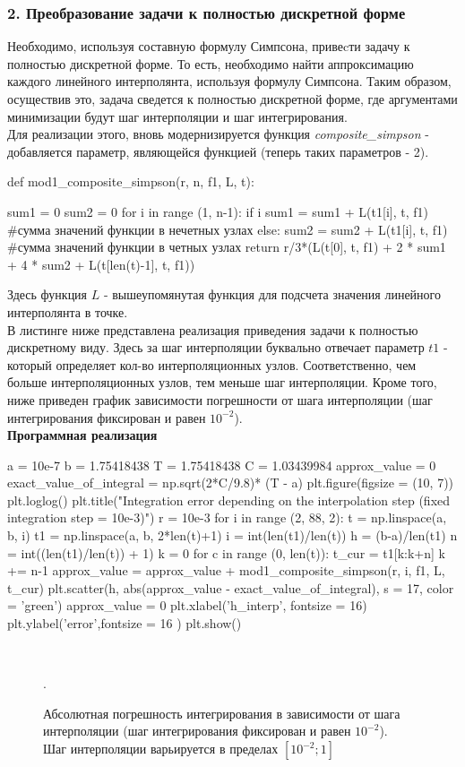 \subsubsection{2. Преобразование задачи к полностью дискретной форме}
Необходимо, используя составную формулу Симпсона, привеcти задачу к полностью дискретной форме. То есть, необходимо найти аппроксимацию каждого линейного интерполянта, используя формулу Симпсона. Таким образом, осуществив это, задача сведется к полностью дискретной форме, где аргументами минимизации будут шаг интерполяции и шаг интегрирования. \\
Для реализации этого, вновь модернизируется функция \textit{composite_simpson} - добавляется параметр, являющейся функцией (теперь таких параметров - 2). 
\begin{python}
def mod1_composite_simpson(r, n, f1, L, t):

  sum1 = 0
  sum2 = 0
  for i in range (1, n-1):
    if i %
      sum1 = sum1 + L(t1[i], t, f1)  #сумма значений функции в нечетных узлах 
    else:
      sum2 = sum2 + L(t1[i], t, f1) #сумма значений функции в четных узлах 
  return r/3*(L(t[0], t, f1) + 2 * sum1 + 4 * sum2 + L(t[len(t)-1], t, f1))
\end{python} 
Здесь функция $L$ - вышеупомянутая функция для подсчета значения линейного интерполянта в точке. \\
В листинге ниже представлена реализация приведения задачи к полностью дискретному виду.
Здесь за шаг интерполяции буквально отвечает параметр $t1$ - который определяет кол-во интерполяционных узлов. Соответственно, чем больше интерполяционных узлов, тем меньше шаг интерполяции. Кроме того, ниже приведен график зависимости погрешности от шага интерполяции (шаг интегрирования фиксирован и равен $10^{-2}$). \\
\textbf{Программная реализация}
\begin{python}
a = 10e-7
b = 1.75418438
T = 1.75418438
C = 1.03439984
approx_value = 0
exact_value_of_integral = np.sqrt(2*C/9.8)* (T - a)
plt.figure(figsize = (10, 7))
plt.loglog()
plt.title("Integration error depending on the interpolation step (fixed integration step = 10e-3)")
r = 10e-3
for i in range (2, 88, 2):
  t = np.linspace(a, b, i)
  t1 = np.linspace(a, b, 2*len(t)+1)
  i = int(len(t1)/len(t))
  h = (b-a)/len(t1)
  n = int((len(t1)/len(t)) + 1)
  k = 0
  for c in range (0, len(t)):
    t_cur = t1[k:k+n]
    k += n-1
    approx_value = approx_value + mod1_composite_simpson(r, i, f1, L, t_cur)
  plt.scatter(h, abs(approx_value - exact_value_of_integral), s = 17, color = 'green')
  approx_value = 0
plt.xlabel('h_interp', fontsize = 16)
plt.ylabel('error',fontsize = 16 )
plt.show()
\end{python}\\
\clearpage
\begin{figure}[t!]
\caption{Абсолютная погрешность интегрирования в зависимости от шага интерполяции (шаг интегрирования фиксирован и равен $10^{-2}$).\\ Шаг интерполяции варьируется в пределах $[10^{-2}; 1]$}.
\end{figure}
